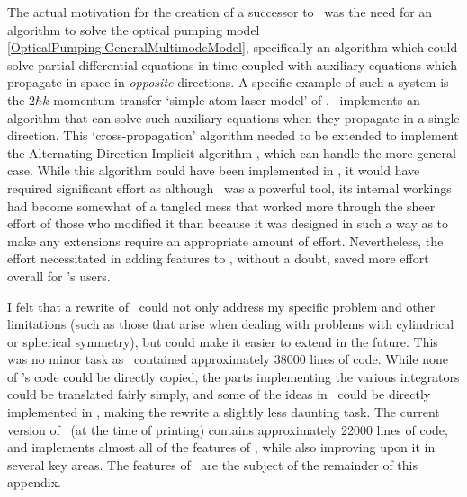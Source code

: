 The actual motivation for the creation of a successor to \XMDS\ was the need for an algorithm to solve the optical pumping model \eqref{OpticalPumping:GeneralMultimodeModel}, specifically an algorithm which could solve partial differential equations in time coupled with auxiliary equations which propagate in space in \emph{opposite} directions.  A specific example of such a system is the $2 \hbar k$ momentum transfer `simple atom laser model' of .  \XMDS\ implements an algorithm that can solve such auxiliary equations when they propagate in a single direction.  This `cross-propagation' algorithm needed to be extended to implement the Alternating-Direction Implicit algorithm \citep{NumericalRecipes}, which can handle the more general case.  While this algorithm could have been implemented in \XMDS, it would have required significant effort as although \XMDS\ was a powerful tool, its internal workings had become somewhat of a tangled mess that worked more through the sheer effort of those who modified it than because it was designed in such a way as to make any extensions require an appropriate amount of effort.  Nevertheless, the effort necessitated in adding features to \XMDS, without a doubt, saved more effort overall for \XMDS's users.  

I felt that a rewrite of \XMDS\ could not only address my specific problem and other limitations (such as those that arise when dealing with problems with cylindrical or spherical symmetry), but could make it easier to extend in the future.  This was no minor task as \XMDS\ contained approximately 38000 lines of code.  While none of \XMDS's code could be directly copied, the parts implementing the various integrators could be translated fairly simply, and some of the ideas in \XMDS\ could be directly implemented in \xpdeint, making the rewrite a slightly less daunting task.  The current version of \xpdeint\ (at the time of printing) contains approximately 22000 lines of code, and implements almost all of the features of \XMDS, while also improving upon it in several key areas.  The features of \xpdeint\ are the subject of the remainder of this appendix.

\section{\xpdeint}


